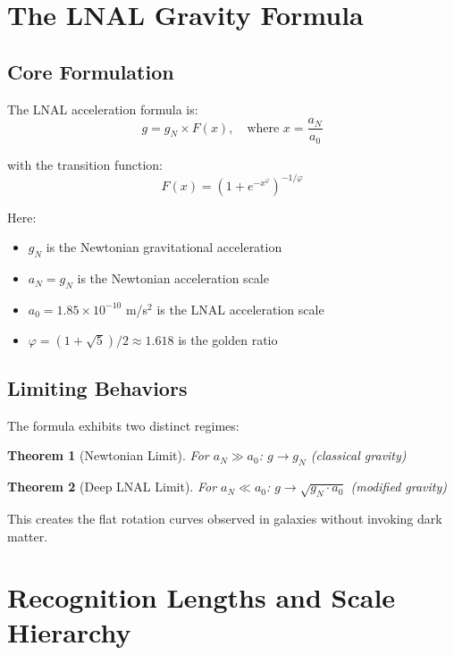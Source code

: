 \documentclass[12pt,a4paper]{article}
\newtheorem{theorem}{Theorem}
\begin{document}
\section{The LNAL Gravity Formula}

\subsection{Core Formulation}

The LNAL acceleration formula is:
\begin{equation}
g = g_N \times F(x), \quad \text{where } x = \frac{a_N}{a_0}
\end{equation}

with the transition function:
\begin{equation}
F(x) = (1 + e^{-x^\varphi})^{-1/\varphi}
\end{equation}

Here:
\begin{itemize}
\item $g_N$ is the Newtonian gravitational acceleration
\item $a_N = g_N$ is the Newtonian acceleration scale
\item $a_0 = 1.85 \times 10^{-10}$ m/s$^2$ is the LNAL acceleration scale
\item $\varphi = (1+\sqrt{5})/2 \approx 1.618$ is the golden ratio
\end{itemize}

\subsection{Limiting Behaviors}

The formula exhibits two distinct regimes:

\begin{theorem}[Newtonian Limit]
For $a_N \gg a_0$: $g \to g_N$ (classical gravity)
\end{theorem}

\begin{theorem}[Deep LNAL Limit]
For $a_N \ll a_0$: $g \to \sqrt{g_N \cdot a_0}$ (modified gravity)
\end{theorem}

This creates the flat rotation curves observed in galaxies without invoking dark matter.

\section{Recognition Lengths and Scale Hierarchy}
\end{document}
